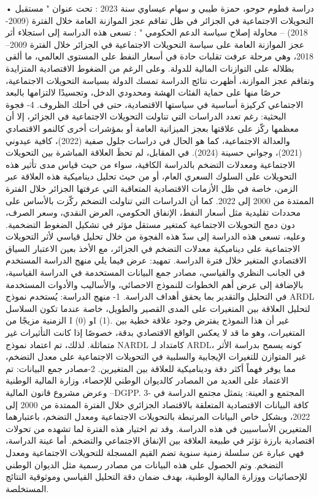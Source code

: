 \documentclass[12pt,a4paper]{report}
\begin{document}
• دراسة  فطوم حوحو، حمزة طيبي و سهام عيساوي سنة 2023 : تحت عنوان " مستقبل التحويلات الاجتماعية في الجزائر في ظل تفاقم عجز الموازنة العامة خلال الفترة (2009-2018) – محاولة إصلاح سياسة الدعم الحكومي " : تسعى هذه الدراسة إلى استجلاء أثر عجز الموازنة العامة على سياسة التحويلات الاجتماعية في الجزائر خلال الفترة 2009–2018، وهي مرحلة عرفت تقلبات حادة في أسعار النفط على المستوى العالمي، ما ألقى بظلاله على التوازنات المالية للدولة. وعلى الرغم من الضغوط الاقتصادية المتزايدة وتفاقم عجز الموازنة، أظهرت نتائج الدراسة تمسك الدولة بسياسة التحويلات الاجتماعية، حرصًا منها على حماية الفئات الهشة ومحدودي الدخل، وتجسيدًا لالتزامها بالبعد الاجتماعي كركيزة أساسية في سياستها الاقتصادية، حتى في أحلك الظروف.
4- فجوة البحثية:
رغم تعدد الدراسات التي تناولت التحويلات الاجتماعية في الجزائر، إلا أن معظمها ركّز على علاقتها بعجز الميزانية العامة أو بمؤشرات أخرى كالنمو الاقتصادي والعدالة الاجتماعية، كما هو الحال في دراسات جلول صفية (2022)، كافية عيدوني (2021)، وجواني حسينة (2024). في المقابل، لم تحظَ العلاقة المباشرة بين التحويلات الاجتماعية ومعدلات التضخم بالدراسة الكافية، سواء من حيث قياس مدى تأثير هذه التحويلات على السلوك السعري العام، أو من حيث تحليل ديناميكية هذه العلاقة عبر الزمن، خاصة في ظل الأزمات الاقتصادية المتعاقبة التي عرفتها الجزائر خلال الفترة الممتدة من 2000 إلى 2022. كما أن الدراسات التي تناولت التضخم ركّزت بالأساس على محددات تقليدية مثل أسعار النفط، الإنفاق الحكومي، العرض النقدي، وسعر الصرف، دون دمج التحويلات الاجتماعية كمتغير مستقل مؤثر في تشكيل الضغوط التضخمية. وعليه، تسعى هذه الدراسة إلى سدّ هذه الفجوة من خلال تحليل قياسي لأثر التحويلات الاجتماعية على ديناميكية معدلات التضخم في الجزائر، مع الأخذ بعين الاعتبار السياق الاقتصادي المتغير خلال فترة الدراسة.
تمهيد:
عرض فيما يلي منهج الدراسة المستخدم في الجانب النظري والقياسي، مصادر جمع البيانات المستخدمة في الدراسة القياسية، بالإضافة إلى عرض أهم الخطوات للنموذج الاحصائي، والأساليب والأدوات المستخدمة في التحليل والتقدير بما يحقق أهداف الدراسة.
1- منهج الدراسة:
يُستخدم نموذج ARDL لتحليل العلاقة بين المتغيرات على المدى القصير والطويل، خاصة عندما تكون السلاسل الزمنية مزيجًا من I (0) وI (1). غير أن هذا النموذج يفترض وجود علاقة خطية بين المتغيرات، وهو ما قد لا يعكس الواقع الاقتصادي بدقة، خصوصًا إذا كانت التأثيرات غير متماثلة. لذلك، تم اعتماد نموذج NARDL كامتداد لـ ARDL، كونه يسمح بدراسة الأثر غير المتوازن للتغيرات الإيجابية والسلبية في التحويلات الاجتماعية على معدل التضخم، مما يوفر فهماً أكثر دقة وديناميكية للعلاقة بين المتغيرين.
2-مصادر جمع البيانات:
تم الاعتماد على العديد من المصادر كالديوان الوطني للإحصاء، وزارة المالية الوطنية وعرض مشروع قانون المالية –DGPP.
3- المجتمع و العينة:
يتمثل مجتمع الدراسة في كافة البيانات الاقتصادية المتعلقة بالاقتصاد الجزائري خلال الفترة الممتدة من 2000 إلى 2022، وبشكل خاص البيانات المرتبطة بالتحويلات الاجتماعية ومعدل التضخم، باعتبارهما المتغيرين الأساسيين في هذه الدراسة. وقد تم اختيار هذه الفترة لما تشهده من تحولات اقتصادية بارزة تؤثر في طبيعة العلاقة بين الإنفاق الاجتماعي والتضخم. أما عينة الدراسة، فهي عبارة عن سلسلة زمنية سنوية تضم القيم المسجلة للتحويلات الاجتماعية ومعدل التضخم. وتم الحصول على هذه البيانات من مصادر رسمية مثل الديوان الوطني للإحصائيات ووزارة المالية الوطنية، بهدف ضمان دقة التحليل القياسي وموثوقية النتائج المستخلصة.
\end{document}
